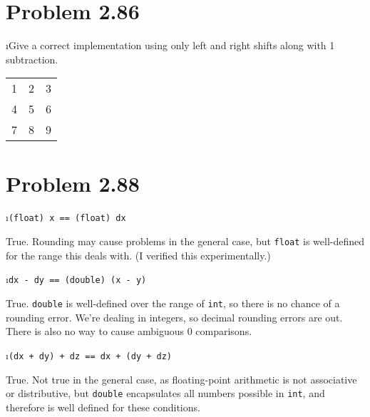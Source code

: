 \documentclass[fleqn]{article}
\begin{document}

\section*{Problem 2.86}

\bee
\i Give a correct implementation using only left and right shifts along with 1 subtraction.

 \begin{solution}
 	\begin{tabular}{ l c r }
  		1 & 2 & 3 \\
  		4 & 5 & 6 \\
  		7 & 8 & 9 \\
	\end{tabular}
 \end{solution}

\ene

\section*{Problem 2.88}

\bee
\i \texttt{(float) x == (float) dx}

 \begin{solution}
 True. Rounding may cause problems in the general case, but \texttt{float} is well-defined for the range this deals with. (I verified this experimentally.)
 \end{solution}

\i \texttt{dx - dy == (double) (x - y)}

 \begin{solution}
 True. \texttt{double} is well-defined over the range of \texttt{int}, so there is no chance of a rounding error. We're dealing in integers, so decimal rounding errors are out. There is also no way to cause ambiguous 0 comparisons.
 \end{solution}

\i \texttt{(dx + dy) + dz == dx + (dy + dz)}

 \begin{solution}
 True. Not true in the general case, as floating-point arithmetic is not associative or distributive, but \texttt{double} encapsulates all numbers possible in \texttt{int}, and therefore is well defined for these conditions.
 \end{solution}
\end{document}

